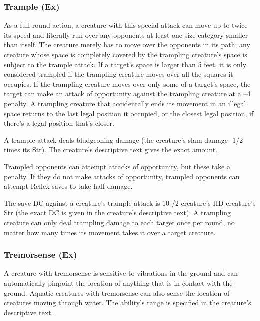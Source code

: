 {\subsubsection{Trample (Ex)} As a full-round action, a creature with this special attack can move up to twice its speed and literally run over any opponents at least one size category smaller than itself. The creature merely has to move over the opponents in its path; any creature whose space is completely covered by the trampling creature's space is subject to the trample attack. If a target's space is larger than 5 feet, it is only considered trampled if the trampling creature moves over all the squares it occupies. If the trampling creature moves over only some of a target's space, the target can make an attack of opportunity against the trampling creature at a –4 penalty. A trampling creature that accidentally ends its movement in an illegal space returns to the last legal position it occupied, or the closest legal position, if there's a legal position that's closer.

A trample attack deals bludgeoning damage (the creature's slam damage -1/2 times its Str). The creature's descriptive text gives the exact amount.

Trampled opponents can attempt attacks of opportunity, but these take a  penalty. If they do not make attacks of opportunity, trampled opponents can attempt Reflex saves to take half damage.

The save DC against a creature's trample attack is 10 /2 creature's HD \add creature's Str (the exact DC is given in the creature's descriptive text). A trampling creature can only deal trampling damage to each target once per round, no matter how many times its movement takes it over a target creature.

\subsubsection{Tremorsense (Ex)} A creature with tremorsense is sensitive to vibrations in the ground and can automatically pinpoint the location of anything that is in contact with the ground. Aquatic creatures with tremorsense can also sense the location of creatures moving through water. The ability's range is specified in the creature's descriptive text.

}
